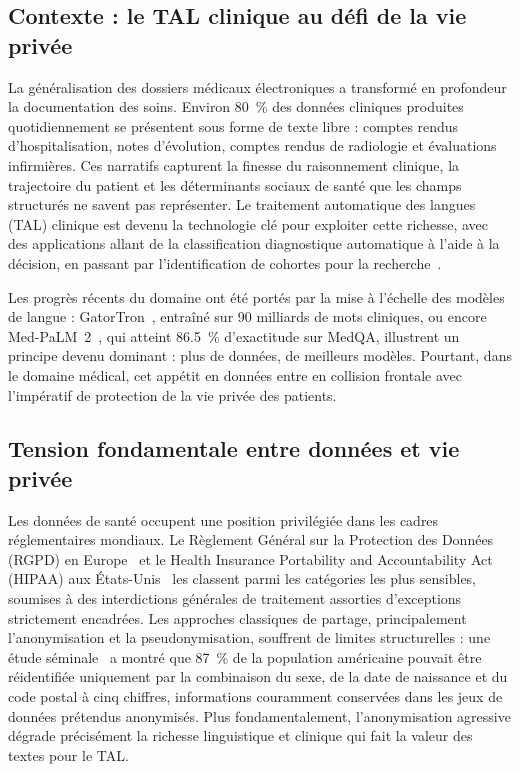 

\subsection{Contexte : le TAL clinique au défi de la vie privée}

La généralisation des dossiers médicaux électroniques a transformé en profondeur la
documentation des soins. Environ 80~\% des données cliniques produites quotidiennement
se présentent sous forme de texte libre : comptes rendus d'hospitalisation, notes d'évolution,
comptes rendus de radiologie et évaluations infirmières. Ces narratifs capturent la finesse du
raisonnement clinique, la trajectoire du patient et les déterminants sociaux de santé que les
champs structurés ne savent pas représenter. Le traitement automatique des langues (TAL)
clinique est devenu la technologie clé pour exploiter cette richesse, avec des applications
allant de la classification diagnostique automatique à l'aide à la décision, en passant par
l'identification de cohortes pour la recherche~\citep{wang2018clinical, kreimeyer2017natural}.

Les progrès récents du domaine ont été portés par la mise à l'échelle des modèles de langue :
GatorTron~\citep{yang2022large}, entraîné sur \num{90} milliards de mots cliniques, ou encore Med-PaLM~2~\citep{singhal2023medpalm2}, qui
atteint \SI{86.5}{\percent} d'exactitude sur MedQA, illustrent un principe devenu dominant :
plus de données, de meilleurs modèles. Pourtant, dans le domaine médical, cet appétit en
données entre en collision frontale avec l'impératif de protection de la vie privée des patients.

\subsection{Tension fondamentale entre données et vie privée}

Les données de santé occupent une position privilégiée dans les cadres réglementaires
mondiaux. Le Règlement Général sur la Protection des Données (RGPD) en Europe~\citep{gdpr2016} et le
Health Insurance Portability and Accountability Act (HIPAA) aux États-Unis~\citep{hipaa1996} les classent
parmi les catégories les plus sensibles, soumises à des interdictions générales de traitement
assorties d'exceptions strictement encadrées. Les approches classiques de partage,
principalement l'anonymisation et la pseudonymisation, souffrent de limites structurelles :
une étude séminale~\citep{sweeney2002} a montré que \SI{87}{\percent} de la population américaine pouvait être
réidentifiée uniquement par la combinaison du sexe, de la date de naissance et du code
postal à cinq chiffres, informations couramment conservées dans les jeux de données
prétendus anonymisés. Plus fondamentalement, l'anonymisation agressive dégrade
précisément la richesse linguistique et clinique qui fait la valeur des textes pour le TAL.

